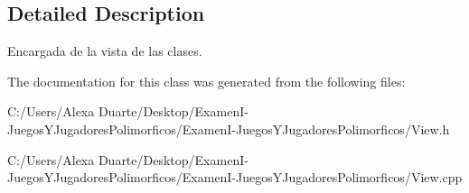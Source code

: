 \subsection{Detailed Description}
Encargada de la vista de las clases. 

The documentation for this class was generated from the following files\+:\begin{DoxyCompactItemize}
\item 
C\+:/\+Users/\+Alexa Duarte/\+Desktop/\+Examen\+I-\/\+Juegos\+Y\+Jugadores\+Polimorficos/\+Examen\+I-\/\+Juegos\+Y\+Jugadores\+Polimorficos/View.\+h\item 
C\+:/\+Users/\+Alexa Duarte/\+Desktop/\+Examen\+I-\/\+Juegos\+Y\+Jugadores\+Polimorficos/\+Examen\+I-\/\+Juegos\+Y\+Jugadores\+Polimorficos/View.\+cpp\end{DoxyCompactItemize}
